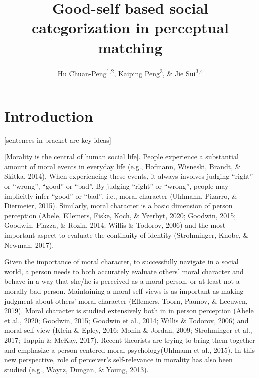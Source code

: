 \documentclass[
  english,
  man]{apa6}
\author{Hu Chuan-Peng\textsuperscript{1,2}, Kaiping Peng\textsuperscript{3}, \& Jie Sui\textsuperscript{3,4}}
\affiliation{
\vspace{0.5cm}
\textsuperscript{1} TBA\\\textsuperscript{2} Leibniz Institute for Resilience Research, 55131 Mainz, Germany\\\textsuperscript{3} Tsinghua University, 100084 Beijing, China\\\textsuperscript{4} University of Aberdeen, Aberdeen, Scotland}
\title{Good-self based social categorization in perceptual matching}
\date{}
\begin{document}
\maketitle

\hypertarget{introduction}{%
\section{Introduction}\label{introduction}}

{[}sentences in bracket are key ideas{]}

{[}Morality is the central of human social life{]}. People experience a substantial amount of moral events in everyday life (e.g., Hofmann, Wisneski, Brandt, \& Skitka, 2014). When experiencing these events, it always involves judging \enquote{right} or \enquote{wrong}, \enquote{good} or \enquote{bad}. By judging \enquote{right} or \enquote{wrong}, people may implicitly infer \enquote{good} or \enquote{bad}, i.e., moral character (Uhlmann, Pizarro, \& Diermeier, 2015). Similarly, moral character is a basic dimension of person perception (Abele, Ellemers, Fiske, Koch, \& Yzerbyt, 2020; Goodwin, 2015; Goodwin, Piazza, \& Rozin, 2014; Willis \& Todorov, 2006) and the most important aspect to evaluate the continuity of identity (Strohminger, Knobe, \& Newman, 2017).

Given the importance of moral character, to successfully navigate in a social world, a person needs to both accurately evaluate others' moral character and behave in a way that she/he is perceived as a moral person, or at least not a morally bad person. Maintaining a moral self-views is as important as making judgment about others' moral character (Ellemers, Toorn, Paunov, \& Leeuwen, 2019). Moral character is studied extensively both in in person perception (Abele et al., 2020; Goodwin, 2015; Goodwin et al., 2014; Willis \& Todorov, 2006) and moral self-view (Klein \& Epley, 2016; Monin \& Jordan, 2009; Strohminger et al., 2017; Tappin \& McKay, 2017). Recent theorists are trying to bring them together and emphasize a person-centered moral psychology(Uhlmann et al., 2015). In this new perspective, role of perceiver's self-relevance in morality has also been studied (e.g., Waytz, Dungan, \& Young, 2013).
\end{document}
